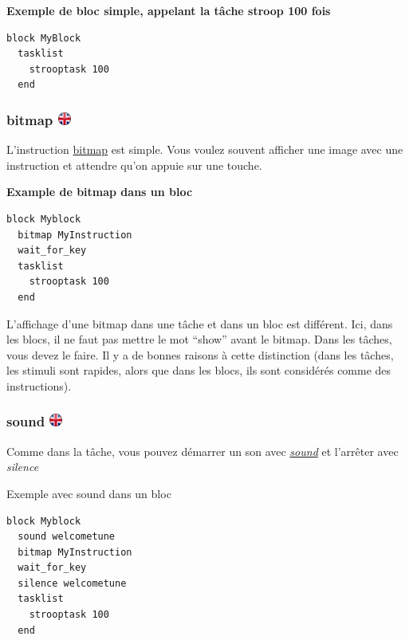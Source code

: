 \documentclass[
]{book}
\begin{document}
\textbf{Exemple de bloc simple, appelant la tâche stroop 100 fois}

\begin{verbatim}
block MyBlock
  tasklist
    strooptask 100
  end
\end{verbatim}

\hypertarget{bitmap}{%
\subsubsection[bitmap ]{\texorpdfstring{bitmap
\href{https://www.psytoolkit.org/doc3.2.0/syntax.html\#block-bitmap}{\protect\includegraphics{img/ukflag.png}}}{bitmap }}\label{bitmap}}

L'instruction \protect\hyperlink{bitmap}{bitmap} est simple. Vous voulez
souvent afficher une image avec une instruction et attendre qu'on appuie
sur une touche.

\textbf{Example de bitmap dans un bloc}

\begin{verbatim}
block Myblock
  bitmap MyInstruction
  wait_for_key
  tasklist
    strooptask 100
  end
\end{verbatim}

L'affichage d'une bitmap dans une tâche et dans un bloc est différent.
Ici, dans les blocs, il ne faut pas mettre le mot ``show'' avant le
bitmap. Dans les tâches, vous devez le faire. Il y a de bonnes raisons à
cette distinction (dans les tâches, les stimuli sont rapides, alors que
dans les blocs, ils sont considérés comme des instructions).

\hypertarget{sound-1}{%
\subsubsection[sound ]{\texorpdfstring{sound
\href{https://www.psytoolkit.org/doc3.2.0/syntax.html\#block-sound}{\protect\includegraphics{img/ukflag.png}}}{sound }}\label{sound-1}}

Comme dans la tâche, vous pouvez démarrer un son avec
\emph{\protect\hyperlink{sound}{sound}} et l'arrêter avec \emph{silence}

Exemple avec sound dans un bloc

\begin{verbatim}
block Myblock
  sound welcometune
  bitmap MyInstruction
  wait_for_key
  silence welcometune
  tasklist
    strooptask 100
  end
\end{verbatim}
\end{document}
